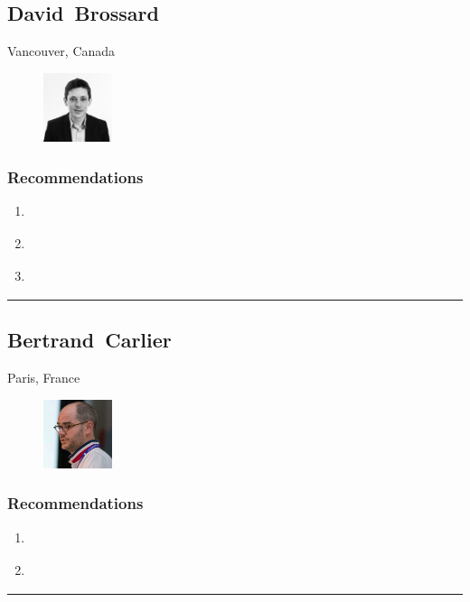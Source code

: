 \subsection{David~Brossard} \textsf{Vancouver, Canada} \par \setlength{\columnsep}{0pt} \begin{figure} \centering \includegraphics[width=0.18\textwidth]{bios/dbrossard.png} \end{figure}  \subsubsection{Recommendations}\begin{enumerate}
\item \cite{Doctorow2019}
\item \cite{ONeil2016}
\item \cite{Schneier2016}
\end{enumerate}\noindent\rule{\textwidth}{0.2pt}

\subsection{Bertrand~Carlier} \textsf{Paris, France} \par \setlength{\columnsep}{0pt} \begin{figure} \centering \includegraphics[width=0.18\textwidth]{bios/bcarlier.jpg} \end{figure}  \subsubsection{Recommendations}\begin{enumerate}
\item \cite{Bertocci2019}
\item \cite{Siriwardena2016}
\end{enumerate}\noindent\rule{\textwidth}{0.2pt}

